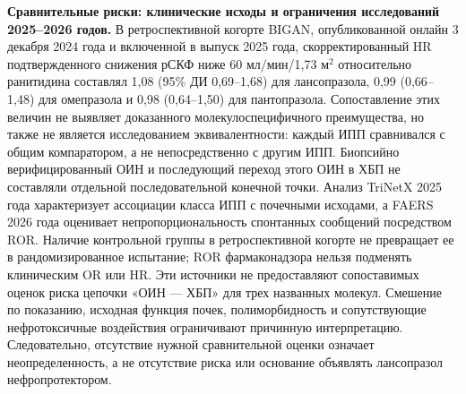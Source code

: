 \documentclass[11pt,a4paper,notitlepage]{report}
\newcommand{\src}[1]{\unskip\space\cite{#1}}
\begin{document}
\textbf{Сравнительные риски: клинические исходы и ограничения исследований 2025--2026 годов.} В ретроспективной когорте BIGAN, опубликованной онлайн 3 декабря 2024 года и включенной в выпуск 2025 года, скорректированный HR подтвержденного снижения рСКФ ниже 60 мл/мин/1,73 м$^2$ относительно ранитидина составлял 1,08 (95\% ДИ 0,69--1,68) для лансопразола, 0,99 (0,66--1,48) для омепразола и 0,98 (0,64--1,50) для пантопразола. Сопоставление этих величин не выявляет доказанного молекулоспецифичного преимущества, но также не является исследованием эквивалентности: каждый ИПП сравнивался с общим компаратором, а не непосредственно с другим ИПП. Биопсийно верифицированный ОИН и последующий переход этого ОИН в ХБП не составляли отдельной последовательной конечной точки.\src{renalbigan2025} Анализ TriNetX 2025 года характеризует ассоциации класса ИПП с почечными исходами, а FAERS 2026 года оценивает непропорциональность спонтанных сообщений посредством ROR. Наличие контрольной группы в ретроспективной когорте не превращает ее в рандомизированное испытание; ROR фармаконадзора нельзя подменять клиническим OR или HR. Эти источники не предоставляют сопоставимых оценок риска цепочки «ОИН --- ХБП» для трех названных молекул. Смешение по показанию, исходная функция почек, полиморбидность и сопутствующие нефротоксичные воздействия ограничивают причинную интерпретацию. Следовательно, отсутствие нужной сравнительной оценки означает неопределенность, а не отсутствие риска или основание объявлять лансопразол нефропротектором.\src{renaltrinetx2025,renalfaers2026}
\end{document}
